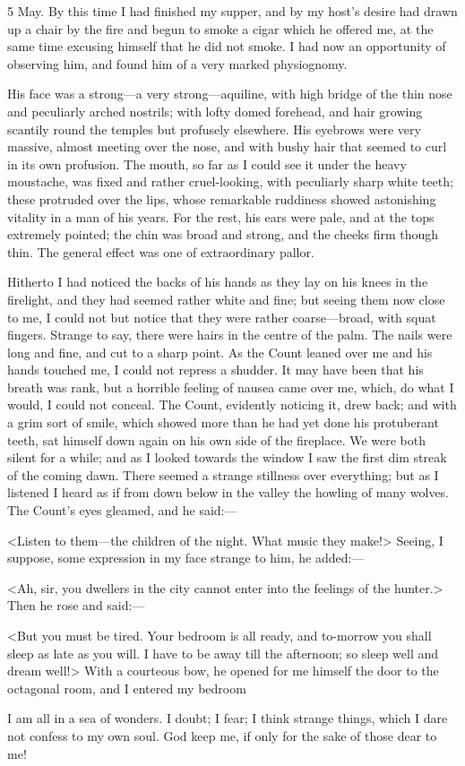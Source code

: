 \begin{diary}{5 May.}
By this time I had finished my supper, and by my host's desire had drawn up a chair by the fire and begun to smoke a cigar which he offered me, at the same time excusing himself that he did not smoke. I had now an opportunity of observing him, and found him of a very marked physiognomy.

His face was a strong—a very strong—aquiline, with high bridge of the thin nose and peculiarly arched nostrils; with lofty domed forehead, and hair growing scantily round the temples but profusely elsewhere. His eyebrows were very massive, almost meeting over the nose, and with bushy hair that seemed to curl in its own profusion. The mouth, so far as I could see it under the heavy moustache, was fixed and rather cruel-looking, with peculiarly sharp white teeth; these protruded over the lips, whose remarkable ruddiness showed astonishing vitality in a man of his years. For the rest, his ears were pale, and at the tops extremely pointed; the chin was broad and strong, and the cheeks firm though thin. The general effect was one of extraordinary pallor.

Hitherto I had noticed the backs of his hands as they lay on his knees in the firelight, and they had seemed rather white and fine; but seeing them now close to me, I could not but notice that they were rather coarse—broad, with squat fingers. Strange to say, there were hairs in the centre of the palm. The nails were long and fine, and cut to a sharp point. As the Count leaned over me and his hands touched me, I could not repress a shudder. It may have been that his breath was rank, but a horrible feeling of nausea came over me, which, do what I would, I could not conceal. The Count, evidently noticing it, drew back; and with a grim sort of smile, which showed more than he had yet done his protuberant teeth, sat himself down again on his own side of the fireplace. We were both silent for a while; and as I looked towards the window I saw the first dim streak of the coming dawn. There seemed a strange stillness over everything; but as I listened I heard as if from down below in the valley the howling of many wolves. The Count's eyes gleamed, and he said:—

<Listen to them—the children of the night. What music they make!> Seeing, I suppose, some expression in my face strange to him, he added:—

<Ah, sir, you dwellers in the city cannot enter into the feelings of the hunter.> Then he rose and said:—

<But you must be tired. Your bedroom is all ready, and to-morrow you shall sleep as late as you will. I have to be away till the afternoon; so sleep well and dream well!> With a courteous bow, he opened for me himself the door to the octagonal room, and I entered my bedroom

I am all in a sea of wonders. I doubt; I fear; I think strange things, which I dare not confess to my own soul. God keep me, if only for the sake of those dear to me!
\end{diary}
 

